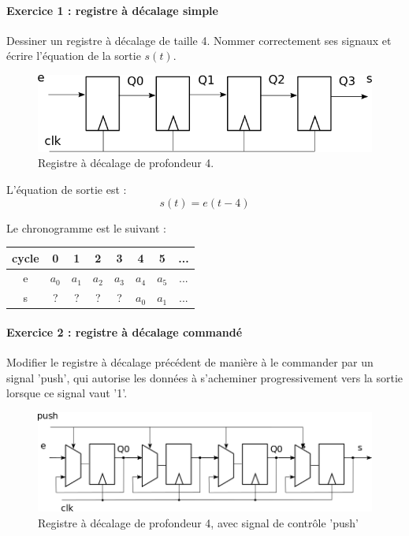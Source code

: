 \documentclass[a4paper,11pt]{article}
\begin{document}
\paragraph{Exercice 1 : registre à décalage simple} Dessiner un registre à décalage de taille 4. Nommer correctement ses signaux et écrire l'équation de la sortie $s(t)$.\\

\begin{figure}[!h]
  \centering
  \includegraphics[scale=0.4]{reg_dec.png}
  \caption{Registre à décalage de profondeur 4.}
  \label{rec_dec}
\end{figure}

L'équation de sortie est :$$ s(t)=e(t-4)$$

Le chronogramme est le suivant :

\begin{center}
\begin{tabular}{c||c|c|c|c|c|c|c}
cycle & 0 & 1 & 2 & 3 & 4 & 5 & ...\\ \hline \hline
e & $a_0$ & $a_1$ & $a_2$ & $a_3$ & $a_4$ & $a_5$ & ...\\ \hline
s & ?   &   ? & ?   & ?   & $a_0$ & $a_1$ & ...\\ \hline
\end{tabular}
\end{center}
\paragraph{Exercice 2 : registre à décalage commandé} Modifier le registre à décalage précédent de manière à le commander par un signal 'push', qui autorise les données à s'acheminer progressivement vers la sortie lorsque ce signal
vaut '1'.\\

\begin{figure}[!h]
  \centering
  \includegraphics[scale=0.4]{reg_dec_ctrl.png}
  \caption{Registre à décalage de profondeur 4, avec signal de contrôle 'push'}
  \label{rec_dec}
\end{figure}
\end{document}
